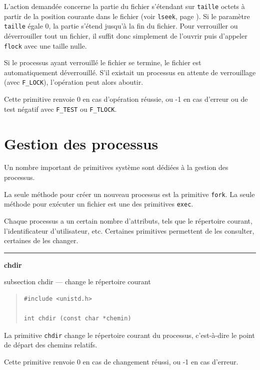 \documentclass [twoside] {report}
\newcommand {\primitive} [1]
    {
	\phantomsection
	{\large \textbf {#1}}
	\addcontentsline {toc} {subsection} {#1}
    }
\newcommand {\separation}
    {
	\vspace {5mm}
	\nopagebreak
	\hrule
    }
\begin{document}
L'action demandée concerne la partie du fichier s'étendant sur
\texttt{taille} octets à partir de la position courante dans
le fichier (voir \texttt{lseek}, page \pageref {lseek}).  Si le
paramètre \texttt{taille} égale 0, la partie s'étend jusqu'à la
fin du fichier. Pour verrouiller ou déverrouiller tout un fichier,
il suffit donc simplement de l'ouvrir puis d'appeler \texttt{flock}
avec une taille nulle.

Si le processus ayant verrouillé le fichier se termine, le fichier est
automatiquement déverrouillé. S'il existait un processus en attente
de verrouillage (avec \texttt {F\_LOCK}), l'opération peut alors aboutir.

Cette primitive renvoie 0 en cas d'opération réussie, ou -1 en cas
d'erreur ou de test négatif avec \texttt{F\_TEST} ou \texttt{F\_TLOCK}.



\section {Gestion des processus}


Un nombre important de primitives système sont
dédiées à la gestion des processus.

La seule méthode pour créer un nouveau processus
est la primitive \texttt {fork}. La seule méthode pour
exécuter un fichier est une des primitives
\texttt {exec}.

Chaque processus a un certain nombre
d'attributs, tels que le répertoire courant,
l'identificateur d'utilisateur, etc. Certaines
primitives permettent de les consulter, certaines
de les changer.


\separation
\primitive {chdir} --- change le répertoire courant

\begin {quote}
\begin {verbatim}
#include <unistd.h>

int chdir (const char *chemin)
\end{verbatim}
\end {quote}

La primitive \texttt {chdir} change le répertoire
courant du processus, c'est-à-dire le point de
départ des chemins relatifs.

Cette primitive renvoie 0 en cas de changement
réussi, ou -1 en cas d'erreur.
\end{document}
